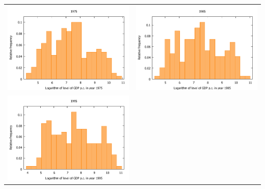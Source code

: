 \documentclass[a4paper]{article}
\begin{document}
\thispagestyle{empty}


\begin{center}
\begin{tabular}{cc}
\includegraphics[scale=0.9]{1a_1} &
  \includegraphics[scale=0.9]{1a_2} \\ [0.25in]
\includegraphics[scale=0.9]{1a_3} &

\end{tabular}
\end{center}
\end{document}
